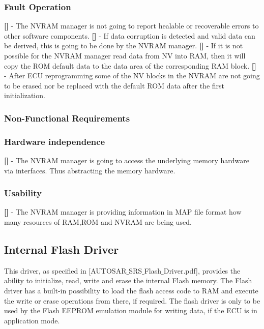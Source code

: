 \subsubsection{Fault Operation}
{\bf []} - The \mbox{NVRAM} manager is not going to report healable or recoverable errors to other software components.\newline
\newline
{\bf []} - If data corruption is detected and valid data can be derived, this is going to be done by the \mbox{NVRAM} manager.\newline
\newline
{\bf []} - If it is not possible for the \mbox{NVRAM} manager read data from \mbox{NV} into \mbox{RAM}, then it will copy the \mbox{ROM} default data to the data area of the corresponding \mbox{RAM} block.\newline
\newline
{\bf []} - After \mbox{ECU} reprogramming some of the \mbox{NV} blocks in the \mbox{NVRAM} are not going to be erased nor be replaced with the default \mbox{ROM} data after the first initialization.\newline
\subsubsection{Non-Functional Requirements}
\subsubsection{Hardware independence}
{\bf []} - The \mbox{NVRAM} manager is going to access the underlying memory hardware via interfaces. Thus abstracting the memory hardware.

\subsubsection{Usability}
{\bf []} - The \mbox{NVRAM} manager is providing information in \mbox{MAP} file format how many resources of \mbox{RAM},\mbox{ROM} and \mbox{NVRAM} are being used.
\newpage

\subsection{Internal Flash Driver}
This driver, as specified in  [AUTOSAR$\_$SRS$\_$Flash$\_$Driver.pdf], provides the ability to initialize, read, write and erase the internal Flash memory. The Flash driver has a built-in possibility to load the flash access code to \mbox{RAM} and execute the write or erase operations from there, if required.\newline
The flash driver is only to be used by the Flash \mbox{EEPROM} emulation module for writing data, if the ECU is in application mode.
